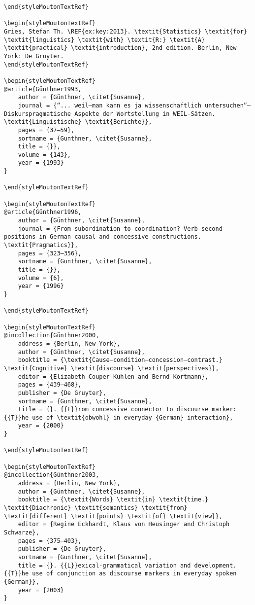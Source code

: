 \begin{styleMoutonHeadingRef}
\begin{verbatim}
\end{styleMoutonTextRef}

\begin{styleMoutonTextRef}
Gries, Stefan Th. \REF{ex:key:2013}. \textit{Statistics} \textit{for} \textit{linguistics} \textit{with} \textit{R:} \textit{A} \textit{practical} \textit{introduction}, 2nd edition. Berlin, New York: De Gruyter.
\end{styleMoutonTextRef}

\begin{styleMoutonTextRef}
@article{Günthner1993,
	author = {Günthner, \citet{Susanne},
	journal = {“... weil—man kann es ja wissenschaftlich untersuchen”—Diskurspragmatische Aspekte der Wortstellung in WEIL-Sätzen. \textit{Linguistische} \textit{Berichte}},
	pages = {37–59},
	sortname = {Gunthner, \citet{Susanne},
	title = {}},
	volume = {143},
	year = {1993}
}

\end{styleMoutonTextRef}

\begin{styleMoutonTextRef}
@article{Günthner1996,
	author = {Günthner, \citet{Susanne},
	journal = {From subordination to coordination? Verb-second positions in German causal and concessive constructions. \textit{Pragmatics}},
	pages = {323–356},
	sortname = {Gunthner, \citet{Susanne},
	title = {}},
	volume = {6},
	year = {1996}
}

\end{styleMoutonTextRef}

\begin{styleMoutonTextRef}
@incollection{Günthner2000,
	address = {Berlin, New York},
	author = {Günthner, \citet{Susanne},
	booktitle = {\textit{Cause—condition—concession—contrast.} \textit{Cognitive} \textit{discourse} \textit{perspectives}},
	editor = {Elizabeth Couper-Kuhlen and Bernd Kortmann},
	pages = {439–468},
	publisher = {De Gruyter},
	sortname = {Gunthner, \citet{Susanne},
	title = {}. {{F}}rom concessive connector to discourse marker: {{T}}he use of \textit{obwohl} in everyday {German} interaction},
	year = {2000}
}

\end{styleMoutonTextRef}

\begin{styleMoutonTextRef}
@incollection{Günthner2003,
	address = {Berlin, New York},
	author = {Günthner, \citet{Susanne},
	booktitle = {\textit{Words} \textit{in} \textit{time.} \textit{Diachronic} \textit{semantics} \textit{from} \textit{different} \textit{points} \textit{of} \textit{view}},
	editor = {Regine Eckhardt, Klaus von Heusinger and Christoph Schwarze},
	pages = {375–403},
	publisher = {De Gruyter},
	sortname = {Gunthner, \citet{Susanne},
	title = {}. {{L}}exical-grammatical variation and development. {{T}}he use of conjunction as discourse markers in everyday spoken {German}},
	year = {2003}
}


\end{verbatim}
\end{styleMoutonHeadingRef}
